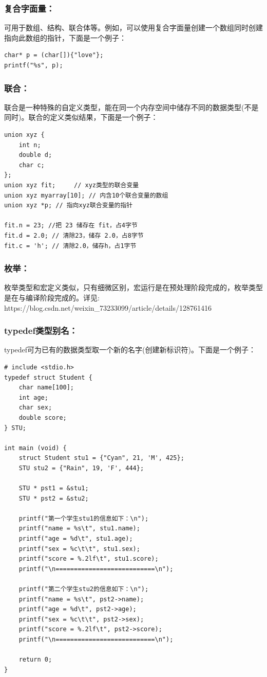 \documentclass[zihao=-4,UTF8]{report}
\begin{document}
\subsubsection{复合字面量：}
可用于数组、结构、联合体等。例如，可以使用复合字面量创建一个数组同时创建指向此数组的指针，下面是一个例子：
\begin{lstlisting}
char* p = (char[]){"love"};
printf("%s", p);
\end{lstlisting}
\subsubsection{联合：}
联合是一种特殊的自定义类型，能在同一个内存空间中储存不同的数据类型(不是同时)。联合的定义类似结果，下面是一个例子：
\begin{lstlisting}
union xyz {
    int n;
    double d;
    char c;
};
union xyz fit;     // xyz类型的联合变量
union xyz myarray[10]; // 内含10个联合变量的数组
union xyz *p; // 指向xyz联合变量的指针

fit.n = 23; //把 23 储存在 fit，占4字节
fit.d = 2.0; // 清除23，储存 2.0，占8字节
fit.c = 'h'; // 清除2.0，储存h，占1字节
\end{lstlisting}
\subsubsection{枚举：}
枚举类型和宏定义类似，只有细微区别，宏运行是在预处理阶段完成的，枚举类型是在与编译阶段完成的。详见: https://blog.csdn.net/weixin\_73233099/article/details/128761416
\subsubsection{typedef类型别名：}
typedef可为已有的数据类型取一个新的名字(创建新标识符)。下面是一个例子：
\begin{lstlisting}
# include <stdio.h> 
typedef struct Student {
    char name[100];
    int age;
    char sex;
    double score;
} STU;
 
int main (void) {
    struct Student stu1 = {"Cyan", 21, 'M', 425};
    STU stu2 = {"Rain", 19, 'F', 444};
 
    STU * pst1 = &stu1;
    STU * pst2 = &stu2;
    
    printf("第一个学生stu1的信息如下：\n");
    printf("name = %s\t", stu1.name);
    printf("age = %d\t", stu1.age);
    printf("sex = %c\t\t", stu1.sex);
    printf("score = %.2lf\t", stu1.score);
    printf("\n===========================\n");

    printf("第二个学生stu2的信息如下：\n");
    printf("name = %s\t", pst2->name);
    printf("age = %d\t", pst2->age);
    printf("sex = %c\t\t", pst2->sex);
    printf("score = %.2lf\t", pst2->score);
    printf("\n===========================\n");

    return 0;
}
\end{lstlisting}
\end{document}

